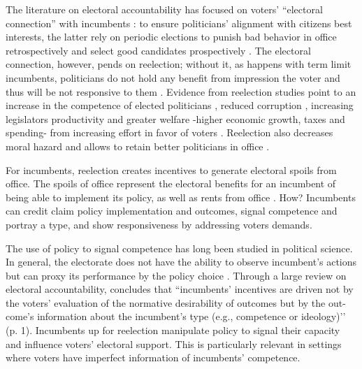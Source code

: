 \documentclass[12pt]{amsart}
\numberwithin{equation}{section}
\theoremstyle{definition}
\theoremstyle{definition}
\theoremstyle{definition}
\begin{document}


The literature on electoral accountability has focused on voters' ``electoral connection''  with incumbents \citep{mayhew_1974}: to ensure politicians' alignment with citizens best interests, the latter rely on periodic elections to punish bad behavior in office retrospectively and select good candidates prospectively \citep{manin_etal_1999}. The electoral connection, however, pends on reelection; without it, as happens with term limit incumbents, politicians do not hold any benefit from impression the voter and thus will be not responsive to them \citep{ashworth_2012}. Evidence from reelection studies point to an increase in the competence of elected politicians \citep{dalbo_etal_2017}, reduced corruption \citep{ferraz_finan_2011}, increasing legislators productivity \citep{hall_etal_2018} and greater welfare -higher economic growth, taxes and spending- from increasing effort in favor of voters \citep{alt_etal_2011}. Reelection also decreases moral hazard and allows to retain better politicians in office \citep{smart_sturm_2013}.      

For incumbents, reelection creates incentives to generate electoral spoils from office. The spoils of office represent the electoral benefits for an incumbent of being able to implement its policy, as well as rents from office \citep{lizzeri_2001}.
How? Incumbents can credit claim policy implementation and outcomes, signal competence and portray a type, and show responsiveness by addressing voters demands.

The use of policy to signal competence has long been studied in political science. In general, the electorate does not have the ability to observe incumbent’s actions but can proxy its performance by the policy choice \citep{ferejohn_1986}. Through a large review on electoral accountability, \citet{ashworth_2012} concludes that ``incumbents’ incentives are driven not by the voters’ evaluation of the normative desirability of outcomes but by the out- come’s information about the incumbent’s type (e.g., competence or ideology)’’ (p. 1). Incumbents up for reelection manipulate policy to signal their capacity and influence voters’ electoral support. This is particularly relevant in settings where voters have imperfect information of incumbents’ competence.
\end{document}
